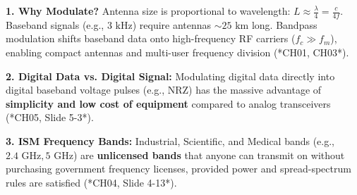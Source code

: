\documentclass[10pt,a4paper]{article}
\begin{document}
\begin{tcolorbox}[
    colframe=themeblue,
    colback=white,
    arc=1.2mm,
    boxrule=0.5pt,
    left=5pt, right=5pt, top=2pt, bottom=2pt
]
\footnotesize
\textbf{1. Why Modulate?} Antenna size is proportional to wavelength: $L \approx \frac{\lambda}{4} = \frac{c}{4f}$. Baseband signals (e.g., $3\text{ kHz}$) require antennas $\sim 25\text{ km}$ long. Bandpass modulation shifts baseband data onto high-frequency RF carriers ($f_c \gg f_m$), enabling compact antennas and multi-user frequency division (*CH01, CH03*).

\textbf{2. Digital Data vs. Digital Signal:} Modulating digital data directly into digital baseband voltage pulses (e.g., NRZ) has the massive advantage of \textbf{simplicity and low cost of equipment} compared to analog transceivers (*CH05, Slide 5-3*).

\textbf{3. ISM Frequency Bands:} Industrial, Scientific, and Medical bands (e.g., $2.4\text{ GHz}, 5\text{ GHz}$) are \textbf{unlicensed bands} that anyone can transmit on without purchasing government frequency licenses, provided power and spread-spectrum rules are satisfied (*CH04, Slide 4-13*).
\end{tcolorbox}

\vspace{1pt}
\end{document}
